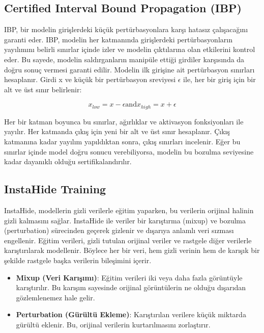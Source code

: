 \subsection{Certified Interval Bound Propagation (IBP)}

IBP, bir modelin girişlerdeki küçük pertürbasyonlara karşı hatasız çalışacağını garanti eder. IBP, modelin her katmanında girişlerdeki pertürbasyonların yayılımını belirli sınırlar içinde izler ve modelin çıktılarına olan etkilerini kontrol eder. Bu sayede, modelin saldırganların manipüle ettiği girdiler karşısında da doğru sonuç vermesi garanti edilir. Modelin ilk girişine ait pertürbasyon sınırları hesaplanır. Girdi x ve küçük bir pertürbasyon sreviyesi $\epsilon$ ile, her bir giriş için bir alt ve üst sınır belirlenir:

\[ x_{low} = x - \epsilon \text{and} x_{high} = x + \epsilon \]

Her bir katman boyunca bu sınırlar, ağırlıklar ve aktivasyon fonksiyonları ile yayılır. Her katmanda çıkış için yeni bir alt ve üst sınır hesaplanır. Çıkış katmanına kadar yayılım yapıldıktan sonra, çıkış sınırları incelenir. Eğer bu sınırlar içinde model doğru sonucu verebiliyorsa, modelin bu bozulma seviyesine kadar dayanıklı olduğu sertifikalandırılır.

\newpage

\subsection{InstaHide Training}

InstaHide, modellerin gizli verilerle eğitim yaparken, bu verilerin orijinal halinin gizli kalmasını sağlar. InstaHide ile veriler bir karıştırma (mixup) ve bozulma (perturbation) sürecinden geçerek gizlenir ve dışarıya anlamlı veri sızması engellenir. Eğitim verileri, gizli tutulan orijinal veriler ve rastgele diğer verilerle karıştırılarak modellenir. Böylece her bir veri, hem gizli verinin hem de karışık bir şekilde rastgele başka verilerin bileşimini içerir.

\begin{itemize}
    \item \textbf{Mixup (Veri Karışımı)}: Eğitim verileri iki veya daha fazla görüntüyle karıştırılır. Bu karışım sayesinde orijinal görüntülerin ne olduğu dışarıdan gözlemlenemez hale gelir.
    \item \textbf{Perturbation (Gürültü Ekleme)}: Karıştırılan verilere küçük miktarda gürültü eklenir. Bu, orijinal verilerin kurtarılmasını zorlaştırır.
\end{itemize}

